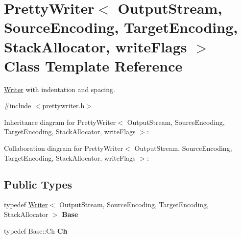 \hypertarget{class_pretty_writer}{}\section{Pretty\+Writer$<$ Output\+Stream, Source\+Encoding, Target\+Encoding, Stack\+Allocator, write\+Flags $>$ Class Template Reference}
\label{class_pretty_writer}


\hyperlink{class_writer}{Writer} with indentation and spacing.  




{\ttfamily \#include $<$prettywriter.\+h$>$}



Inheritance diagram for Pretty\+Writer$<$ Output\+Stream, Source\+Encoding, Target\+Encoding, Stack\+Allocator, write\+Flags $>$\+:


Collaboration diagram for Pretty\+Writer$<$ Output\+Stream, Source\+Encoding, Target\+Encoding, Stack\+Allocator, write\+Flags $>$\+:
\subsection*{Public Types}
\begin{DoxyCompactItemize}
\item 
\mbox{\label{class_pretty_writer_adb8bbfb9058e97d6936f34165dec7268}} 
typedef \hyperlink{class_writer}{Writer}$<$ Output\+Stream, Source\+Encoding, Target\+Encoding, Stack\+Allocator $>$ {\bfseries Base}
\item 
\mbox{\label{class_pretty_writer_ae35c89bda4c5d59d3ff6efcf2fea45a3}} 
typedef Base\+::\+Ch {\bfseries Ch}
\end{DoxyCompactItemize}
